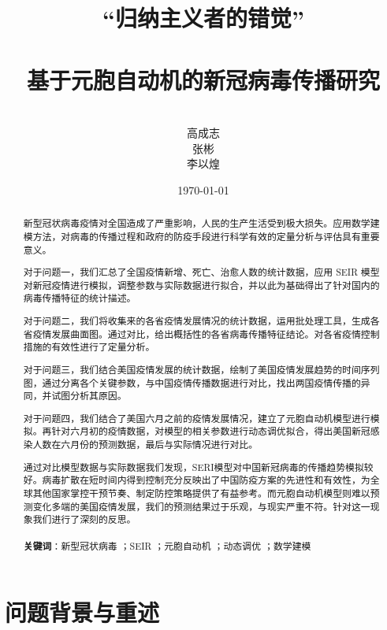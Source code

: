 \documentclass[UTF8]{ctexart}
\title{“归纳主义者的错觉” \\ \hspace*{\fill} \\ 基于元胞自动机的新冠病毒传播研究}
\author{\\高成志\\ 张彬 \\李以煌}
\date{\today}
\begin{document}
\maketitle

\newpage
\begin{abstract}
    \par 
    新型冠状病毒疫情对全国造成了严重影响，人民的生产生活受到极大损失。应用数学建模方法，对病毒的传播过程和政府的防疫手段进行科学有效的定量分析与评估具有重要意义。
    \par 
    对于问题一，我们汇总了全国疫情新增、死亡、治愈人数的统计数据，应用 SEIR 模型对新冠疫情进行模拟，调整参数与实际数据进行拟合，并以此为基础得出了针对国内的病毒传播特征的统计描述。
    \par 
    对于问题二，我们将收集来的各省疫情发展情况的统计数据，运用批处理工具，生成各省疫情发展曲面图。通过对比，给出概括性的各省病毒传播特征结论。对各省疫情控制措施的有效性进行了定量分析。
    \par 
    对于问题三，我们结合美国疫情发展的统计数据，绘制了美国疫情发展趋势的时间序列图，通过分离各个关键参数，与中国疫情传播数据进行对比，找出两国疫情传播的异同，并试图分析其原因。
    \par 
    对于问题四，我们结合了美国六月之前的疫情发展情况，建立了元胞自动机模型进行模拟。再针对六月初的疫情数据，对模型的相关参数进行动态调优拟合，得出美国新冠感染人数在六月份的预测数据，最后与实际情况进行对比。
    \par 
    通过对比模型数据与实际数据我们发现，SERI模型对中国新冠病毒的传播趋势模拟较好。病毒扩散在短时间内得到控制充分反映出了中国防疫方案的先进性和有效性，为全球其他国家掌控干预节奏、制定防控策略提供了有益参考。而元胞自动机模型则难以预测变化多端的美国疫情发展，我们的预测结果过于乐观，与现实严重不符。针对这一现象我们进行了深刻的反思。
    \\ \hspace*{\fill} \\  
    \textbf{关键词}：新型冠状病毒 ；SEIR ；元胞自动机 ；动态调优 ；数学建模
\end{abstract}
\newpage

\tableofcontents

\newpage
\section{问题背景与重述}
\end{document}
